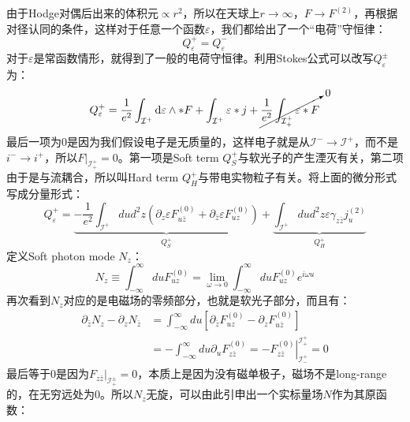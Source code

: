 由于Hodge对偶后出来的体积元$\propto r^2$，所以在天球上$r\to\infty$，$F\to F^{(2)}$，再根据对径认同的条件，这样对于任意一个函数$\varepsilon$，我们都给出了一个“电荷”守恒律：
\begin{equation}
	\boxed{
	Q_\varepsilon^+=Q_\varepsilon^-
	}
\end{equation}
对于$\varepsilon$是常函数情形，就得到了一般的电荷守恒律。利用Stokes公式可以改写$Q_\varepsilon^{\pm}$为：
\begin{equation}
	Q_\varepsilon^+=\frac{1}{e^2}\int_{\mathcal{I}^+}\mathrm{d}\varepsilon\wedge*F+\int_{\mathcal{I}^+}\varepsilon*j+\cancelto{0}{\frac{1}{e^2}\int_{\mathcal{I}_+^+}\varepsilon*F}
\end{equation}
最后一项为0是因为我们假设电子是无质量的，这样电子就是从$\mathcal{I}^-\to\mathcal{I}^+$，而不是$i^{-}\to i^+$，所以$F|_{\mathcal{I}_+^{+}}=0$。第一项是Soft term $Q_S^+$与软光子的产生湮灭有关，第二项由于是与流耦合，所以叫Hard term $Q_H^+$与带电实物粒子有关。将上面的微分形式写成分量形式：
\begin{equation}
	Q_{\varepsilon}^{+}=\underbrace{-\frac{1}{e^{2}}\int_{\mathcal{I}^{+}}dud^{2}z\left(\partial_{z}\varepsilon F_{u\bar{z}}^{(0)}+\partial_{\bar{z}}\varepsilon F_{uz}^{(0)}\right)}_{Q_{S}^{+}}+\underbrace{\int_{\mathcal{I}^{+}}dud^{2}z\varepsilon\gamma_{z\bar{z}}j_{u}^{(2)}}_{Q_{H}^{+}}
\end{equation}
定义Soft photon mode $N_z$：
\begin{equation}\label{eq:23.18}
	N_{z}\equiv \int_{-\infty}^{\infty}duF_{uz}^{(0)}=\lim_{\omega\to0}\int_{-\infty}^{\infty}duF_{uz}^{(0)}e^{i\omega u}
\end{equation}
再次看到$N_z$对应的是电磁场的零频部分，也就是软光子部分，而且有：
\begin{equation}
	\begin{aligned}
		\partial_{\bar{z}}N_{z}-\partial_{z}N_{\bar{z}}& =\int_{-\infty}^{\infty}du\left[\partial_{\bar{z}}F_{uz}^{(0)}-\partial_{z}F_{u\bar{z}}^{(0)}\right]  \\
		&=-\int_{-\infty}^{\infty}du\left.\partial_{u}F_{z\bar{z}}^{(0)}=-F_{z\bar{z}}^{(0)}\right|_{\mathcal{I}_{-}^{+}}^{\mathcal{I}_{+}^{+}}=0
	\end{aligned}
\end{equation}
最后等于0是因为$F_{z\bar z}|_{\mathcal{I}_{+}^{\pm}}=0$，本质上是因为没有磁单极子，磁场不是long-range的，在无穷远处为0。所以$N_z$无旋，可以由此引申出一个实标量场$N$作为其原函数：
